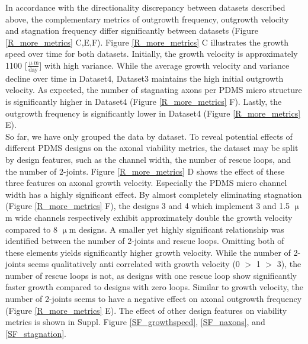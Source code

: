 In accordance with the directionality discrepancy between datasets described
above, the complementary metrics of outgrowth frequency, outgrowth velocity and
stagnation frequency differ significantly between datasets (Figure
\ref{R_more_metrics} C,E,F). Figure \ref{R_more_metrics} C illustrates the
growth speed over time for both datasets. Initially, the growth velocity is
approximately 1100 [$\frac{\mathrm{\upmu}\mathrm{m}}{\mathrm{day}}$] with high
variance. While the average growth velocity and variance decline over time in
Dataset4, Dataset3 maintains the high initial outgrowth velocity. As expected,
the number of stagnating axons per PDMS micro structure is significantly higher
in Dataset4 (Figure \ref{R_more_metrics} F). Lastly, the outgrowth frequency is
significantly lower in Dataset4 (Figure \ref{R_more_metrics} E). \\

So far, we have only grouped the data by dataset. To reveal potential effects of
different PDMS designs on the axonal viability metrics, the dataset may be split
by design features, such as the channel width, the number of rescue loops, and
the number of 2-joints. Figure \ref{R_more_metrics} D shows the effect of these
three features on axonal growth velocity. Especially the PDMS micro channel
width has a highly significant effect. By almost completely eliminating
stagnation (Figure \ref{R_more_metrics} F),  the designs 3 and 4 which implement
3 and 1.5 $\upmu$m wide channels respectively exhibit approximately double the
growth velocity compared to 8 $\upmu$m designs. A smaller yet highly significant
relationship was identified between the number of 2-joints and rescue loops.
Omitting both of these elements yields significantly higher growth velocity.
While the number of 2-joints seems qualitatively anti correlated with growth
velocity (0 $>$ 1 $>$ 3), the number of rescue loops is not, as designs with one
rescue loop show significantly faster growth compared to designs with zero
loops. Similar to growth velocity, the number of 2-joints seems to have a
negative effect on axonal outgrowth frequency (Figure \ref{R_more_metrics} E).
The effect of other design features on viability metrics is shown in Suppl.
Figure \ref{SF_growthspeed}, \ref{SF_naxons}, and \ref{SF_stagnation}.

